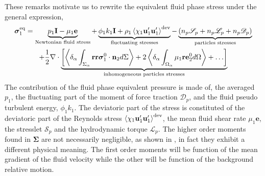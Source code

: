 These remarks motivate us to rewrite the equivalent fluid phase stress under the general expression,  
\begin{multline*}
    \bm{\sigma}_1^\text{eq}
    = 
    \underbrace{p_1  \textbf{I}
    - \mu_1 \textbf{e} }_\text{Newtonian fluid stress}
    +  \underbrace{\phi_1 k_1 \textbf{I}
    + \rho_1 \left<\chi_1\textbf{u}_1'\textbf{u}_1'\right>^\text{dev}}_\text{fluctuating stresses}
    - \underbrace{(n_p \mathscr{S}_p
    + n_p \mathscr{L}_p
    + n_p \mathscr{D}_p )}_\text{particles stresses}\\
    + \frac{1}{2} \mathbf{\nabla}\cdot \underbrace{\left[
        \left<\delta_\alpha \int_{\Sigma_\alpha} \textbf{rr}\bm{\sigma}_1^0\cdot \textbf{n}_2 d\Sigma\right>
        + 2\left<\delta_\alpha \int_{\Omega_\alpha} \mu_1 \textbf{re}_2^0  d\Omega\right>
        + \ldots
        \right]
        }_\text{inhomogeneous particles stresses}
    \label{eq:sigma_eq1_def}
\end{multline*}
The contribution of the fluid phase equivalent pressure is made of,
the averaged $p_1$, the fluctuating part of the moment of force traction $\mathscr{D}_p$, and the fluid pseudo turbulent energy, $\phi_1 k_1$. 
The deviatoric part of the stress is constituted of the deviatoric part of the Reynolds stress $\left<\chi_1\textbf{u}_1'\textbf{u}_1'\right>^\text{dev}$, the mean fluid shear rate $\mu_1 \textbf{e}$, the stresslet $\mathscr{S}_p$ and the hydrodynamic torque $\mathscr{L}_p$. 
The higher order moments found in $\bm{\Sigma}$ are not necessarily negligible, as shown in \citet{lhuillier1996contribution,jackson1997locally}, in fact they exhibit a different physical meaning. 
The first order moments will be function of the mean gradient of the fluid velocity while the other will be function of the background relative motion. 


